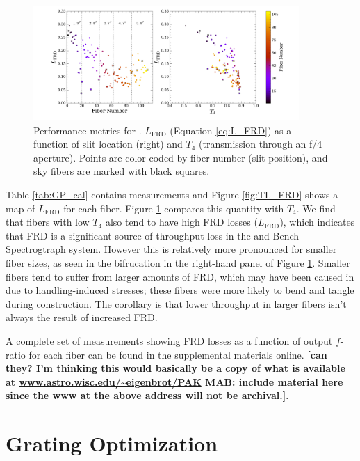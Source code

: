 \begin{appendices}
\begin{figure}
  \centering
  \includegraphics[width=0.9\textwidth]{891_1/figs/gradpak_Lplots.pdf}
  \caption{\label{fig:FRD_loss}\fixspacing Performance metrics for
    \GP. $L_\mathrm{FRD}$ (Equation \ref{eq:L_FRD}) as a function of
    slit location (right) and $T_4$ (transmission through an f/4
    aperture). Points are color-coded by fiber number (slit position),
    and sky fibers are marked with black squares.}
\end{figure}

Table \ref{tab:GP_cal} contains measurements and Figure
\ref{fig:TL_FRD} shows a map of $L_\mathrm{FRD}$ for each \GP
fiber. Figure \ref{fig:FRD_loss} compares this quantity with $T_4$. We
find that fibers with low $T_4$ also tend to have high FRD losses
($L_\mathrm{FRD}$), which indicates that FRD is a significant source
of throughput loss in the \GP and Bench Spectrogtraph system.  However
this is relatively more pronounced for smaller fiber sizes, as seen in
the bifrucation in the right-hand panel of Figure
\ref{fig:FRD_loss}. Smaller fibers tend to suffer from larger amounts
of FRD, which may have been caused in \GP due to handling-induced
stresses; these fibers were more likely to bend and tangle during
construction.  The corollary is that lower throughput in larger fibers
isn't always the result of increased FRD.

A complete set of measurements showing FRD losses as a function of
output $f$-ratio for each fiber can be found in the supplemental
materials online. {\bf [can they? I'm thinking this would basically be
    a copy of what is available at
    \url{www.astro.wisc.edu/~eigenbrot/PAK} MAB: include material here
    since the www at the above address will not be archival.]}.

% 

\section{Grating Optimization}
\label{sec:grating}


\end{appendices}

